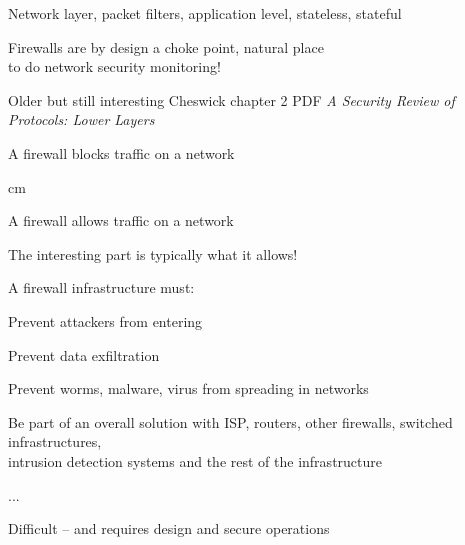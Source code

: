 \documentclass[Screen16to9,17pt]{foils}
\begin{document}
\begin{list2}
\item Network layer, packet filters, application level, stateless, stateful
\item Firewalls are by design a choke point, natural place \\
to do network security monitoring!
\item Older but still interesting Cheswick chapter 2 PDF
\emph{A Security Review of Protocols:
Lower Layers}\\
\end{list2}








\centerline{\hlkbig A firewall {\color{security6blue}blocks traffic} on a network}

 cm
\pause

\centerline{\hlkbig A firewall {\color{red}allows traffic} on a network}
{\small The interesting part is typically what it allows!}

\begin{list1}
\item A firewall infrastructure must:
\begin{list2}
\item Prevent attackers from entering
\item Prevent data exfiltration
\item Prevent worms, malware, virus from spreading in networks
\item Be part of an overall solution with ISP, routers, other firewalls, switched infrastructures,\\
  intrusion detection systems and the rest of the infrastructure
\item ...
\end{list2}
\end{list1}

\vskip 5mm
\centerline{Difficult -- and requires design and secure operations}




\end{document}

